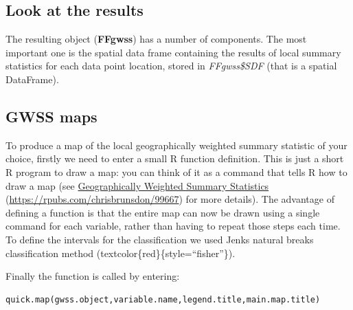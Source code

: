 \documentclass[
]{book}
\newenvironment{Shaded}{\begin{snugshade}}{\end{snugshade}}
\newcommand{\CommentTok}[1]{\textcolor[rgb]{0.56,0.35,0.01}{\textit{#1}}}
\newcommand{\FunctionTok}[1]{\textcolor[rgb]{0.13,0.29,0.53}{\textbf{#1}}}
\newcommand{\NormalTok}[1]{#1}
\newcommand{\SpecialCharTok}[1]{\textcolor[rgb]{0.81,0.36,0.00}{\textbf{#1}}}
\begin{document}
\hypertarget{look-at-the-results}{%
\subsection{Look at the results}\label{look-at-the-results}}

The resulting object (\textbf{FFgwss}) has a number of components.
The most important one is the spatial data frame containing the results of local summary statistics for each data point location, stored in \emph{FFgwss\$SDF} (that is a spatial DataFrame).

\begin{Shaded}
\end{Shaded}

\hypertarget{gwss-maps}{%
\subsection{GWSS maps}\label{gwss-maps}}

To produce a map of the local geographically weighted summary statistic of your choice, firstly we need to enter a small R function definition.
This is just a short R program to draw a map: you can think of it as a command that tells R how to draw a map (see \protect\hyperlink{geographically-weighted-summary-statistics}{Geographically Weighted Summary Statistics} (\url{https://rpubs.com/chrisbrunsdon/99667}) for more details).
The advantage of defining a function is that the entire map can now be drawn using a single command for each variable, rather than having to repeat those steps each time.
To define the intervals for the classification we used Jenks natural breaks classification method (textcolor\{red\}\{style=``fisher''\}).

Finally the function is called by entering:

\begin{verbatim}
quick.map(gwss.object,variable.name,legend.title,main.map.title)
\end{verbatim}
\end{document}
